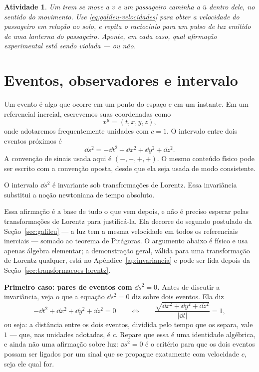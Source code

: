 \documentclass[12pt,a4paper,oneside]{book}
\theoremstyle{rgplain}
\newtheorem{activity}{Atividade}[chapter]
\theoremstyle{rgremark}
\begin{document}
\begin{activity}
Um trem se move a $v$ e um passageiro caminha a $\bar u$ dentro dele, no sentido
do movimento. Use \eqref{eq:galileu-velocidades} para obter a velocidade do
passageiro em relação ao solo, e repita o raciocínio para um pulso de luz
emitido de uma lanterna do passageiro. Aponte, em cada caso, qual afirmação
experimental está sendo violada --- ou não.
\end{activity}

\section{Eventos, observadores e intervalo}
\label{sec:eventos-intervalo}

Um evento é algo que ocorre em um ponto do espaço e em um instante. Em um
referencial inercial, escrevemos suas coordenadas como
\[
  x^\mu=(t,x,y,z),
\]
onde adotaremos frequentemente unidades com $c=1$. O intervalo entre dois
eventos próximos é
\[
  \dd s^2=-\dd t^2+\dd x^2+\dd y^2+\dd z^2.
\]
A convenção de sinais usada aqui é $(-,+,+,+)$. O mesmo conteúdo físico pode
ser escrito com a convenção oposta, desde que ela seja usada de modo
consistente.

\begin{resultado}
O intervalo $\dd s^2$ é invariante sob transformações de Lorentz. Essa
invariância substitui a noção newtoniana de tempo absoluto.
\end{resultado}

Essa afirmação é a base de tudo o que vem depois, e não é preciso esperar
pelas transformações de Lorentz para justificá-la. Ela decorre do segundo
postulado da Seção~\ref{sec:galileu} --- a luz tem a mesma velocidade em todos
os referenciais inerciais --- somado ao teorema de Pitágoras. O argumento abaixo é físico e
usa apenas álgebra elementar; a demonstração geral, válida para uma
transformação de Lorentz qualquer, está no Apêndice~\ref{ap:invariancia} e
pode ser lida depois da Seção~\ref{sec:transformacoes-lorentz}.

\textbf{Primeiro caso: pares de eventos com $\dd s^2=0$.} Antes de discutir a invariância, veja o que a equação $\dd s^2=0$ diz sobre dois eventos. Ela diz
\[
  -\dd t^2+\dd x^2+\dd y^2+\dd z^2=0
  \qquad\Longleftrightarrow\qquad
  \frac{\sqrt{\dd x^2+\dd y^2+\dd z^2}}{|\dd t|}=1 ,
\]
ou seja: a distância entre os dois eventos, dividida pelo tempo que os separa,
vale $1$ --- que, nas unidades adotadas, é $c$. Repare que essa é uma
identidade algébrica, e ainda não uma afirmação sobre luz: $\dd s^2=0$ é o
critério para que os dois eventos possam ser ligados por um sinal que se
propague exatamente com velocidade $c$, seja ele qual for.
\end{document}
